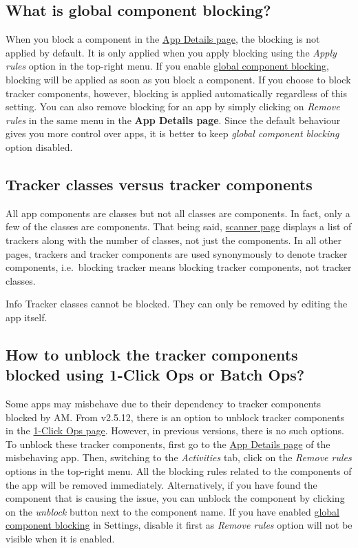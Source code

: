 \subsection{What is global component blocking?}\label{subsec:faq:what-is-global-component-blocking}
When you block a component in the \hyperref[sec:app-details-page]{App Details page}, the blocking is not applied by
default. It is only applied when you apply blocking using the \textit{Apply rules} option in the top-right menu. If you
enable \hyperref[subsubsec:instant-component-blocking]{global component blocking}, blocking will be applied as soon as you block a component. If you choose to
block tracker components, however, blocking is applied automatically regardless of this setting. You can also remove
blocking for an app by simply clicking on \textit{Remove rules} in the same menu in the \textbf{App Details page}. Since
the default behaviour gives you more control over apps, it is better to keep \textit{global component blocking} option
disabled.

\subsection{Tracker classes versus tracker components}\label{subsec:tracker-classes-versus-tracker-components}
All app components are classes but not all classes are components. In fact, only a few of the classes are components.
That being said, \hyperref[sec:scanner-page]{scanner page} displays a list of trackers along with the number of classes,
not just the components. In all other pages, trackers and tracker components are used synonymously to denote tracker
components, i.e.\ blocking tracker means blocking tracker components, not tracker classes.

\begin{tip}{Info}
    Tracker classes cannot be blocked. They can only be removed by editing the app itself.
\end{tip}

\subsection{How to unblock the tracker components blocked using 1-Click Ops or Batch Ops?}\label{subsec:faq:how-to-unblock-tracker-components}
Some apps may misbehave due to their dependency to tracker components blocked by AM. From v2.5.12, there is an option
to unblock tracker components in the \hyperref[sec:1-click-ops-page]{1-Click Ops page}. However, in previous versions,
there is no such options. To unblock these tracker components, first go to the \hyperref[sec:app-details-page]{App
Details page} of the misbehaving app. Then, switching to the \textit{Activities} tab, click on the \textit{Remove rules}
options in the top-right menu. All the blocking rules related to the components of the app will be removed immediately.
Alternatively, if you have found the component that is causing the issue, you can unblock the component by clicking on
the \textit{unblock} button next to the component name. If you have enabled
\hyperref[subsubsec:instant-component-blocking]{global component blocking} in Settings, disable it first as
\textit{Remove rules} option will not be visible when it is enabled.

